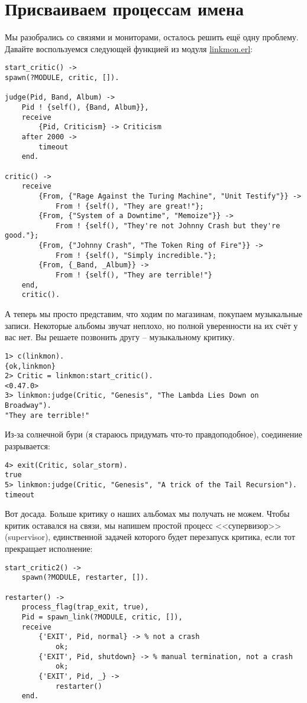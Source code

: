 \section{Присваиваем процессам имена}
Мы разобрались со связями и мониторами, осталось решить ещё одну проблему.
Давайте воспользуемся следующей функцией из модуля \href{http://learnyousomeerlang/original/learnyousomeerlang.com/static/erlang/linkmon.erl}{linkmon.erl}:
\begin{lstlisting}[style=erlang]
start_critic() ->
spawn(?MODULE, critic, []).
 
judge(Pid, Band, Album) ->
    Pid ! {self(), {Band, Album}},
    receive
        {Pid, Criticism} -> Criticism
    after 2000 ->
        timeout
    end.
 
critic() ->
    receive
        {From, {"Rage Against the Turing Machine", "Unit Testify"}} ->
            From ! {self(), "They are great!"};
        {From, {"System of a Downtime", "Memoize"}} ->
            From ! {self(), "They're not Johnny Crash but they're good."};
        {From, {"Johnny Crash", "The Token Ring of Fire"}} ->
            From ! {self(), "Simply incredible."};
        {From, {_Band, _Album}} ->
            From ! {self(), "They are terrible!"}
    end,
    critic().
\end{lstlisting}

А теперь мы просто представим, что ходим по магазинам, покупаем музыкальные записи.
Некоторые альбомы звучат неплохо, но полной уверенности на их счёт у вас нет.
Вы решаете позвонить другу \--- музыкальному критику.
\begin{lstlisting}[style=erlang]
1> c(linkmon).                        
{ok,linkmon}
2> Critic = linkmon:start_critic().
<0.47.0>
3> linkmon:judge(Critic, "Genesis", "The Lambda Lies Down on Broadway").
"They are terrible!"
\end{lstlisting}

Из\--за солнечной бури (я стараюсь придумать что\--то правдоподобное), соединение разрывается:
\begin{lstlisting}[style=erlang]
4> exit(Critic, solar_storm).
true
5> linkmon:judge(Critic, "Genesis", "A trick of the Tail Recursion").
timeout
\end{lstlisting}

Вот досада.
Больше критику о наших альбомах мы получать не можем.
Чтобы критик оставался на связи, мы напишем простой процесс <<супервизор>> (supervisor), единственной задачей которого будет перезапуск критика, если тот прекращает исполнение:
\begin{lstlisting}[style=erlang]
start_critic2() ->
    spawn(?MODULE, restarter, []).
 
restarter() ->
    process_flag(trap_exit, true),
    Pid = spawn_link(?MODULE, critic, []),
    receive
        {'EXIT', Pid, normal} -> % not a crash
            ok;
        {'EXIT', Pid, shutdown} -> % manual termination, not a crash
            ok;
        {'EXIT', Pid, _} ->
            restarter()
    end.
\end{lstlisting}

